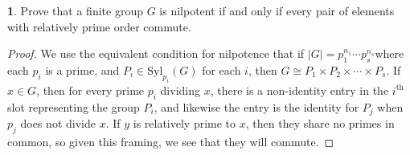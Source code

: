 \documentclass[12pt]{article}
\theoremstyle{definition}
\newtheorem{ex}{}
\newenvironment{exercise}[1]{
	\renewcommand{\theex}{#1}
	\begin{ex}
		}{\end{ex}}
\begin{document}
\begin{exercise}{7}
	Prove that a finite group $G$ is nilpotent if and only if every pair of elements with relatively prime order commute.
\end{exercise}
\begin{proof}
	We use the equivalent condition for nilpotence that if $|G| = p_1^{n_1} \cdots  p_s^{n_s}$where each $p_i$ is a prime, and $P_i \in \mathrm{Syl}_{p_i}(G)$ for each $i$, then $G \cong P_1 \times P_2 \times \cdots \times P_s$.
  If $x \in G$, then for every prime $p_i$ dividing $x$, there is a non-identity entry in the $i^{\text{th}}$ slot representing the group $P_i$, and likewise the entry is the identity for $P_j$ when $p_j$ does not divide $x$.
  If $y$ is relatively prime to $x$, then they share no primes in common, so given this framing, we see that they will commute.
\end{proof}
\end{document}
